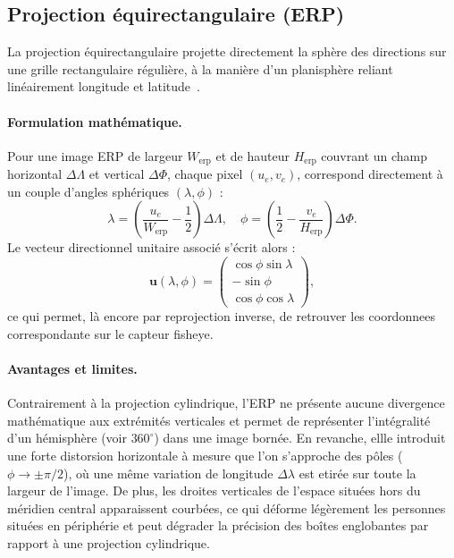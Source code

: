 \documentclass[11pt,a4paper]{article}
\begin{document}
\subsection{Projection équirectangulaire (ERP)}

La projection équirectangulaire projette directement la sphère des directions sur une grille rectangulaire régulière, à la manière d'un planisphère reliant linéairement longitude et latitude~\cite{ohashi2017,bourkefish2pano}.

\paragraph{Formulation mathématique.}
Pour une image ERP de largeur $W_{\text{erp}}$ et de hauteur $H_{\text{erp}}$ couvrant un champ horizontal $\Delta\Lambda$ et vertical $\Delta\Phi$, chaque pixel $(u_e, v_e)$, correspond directement à un couple d'angles sphériques $(\lambda, \phi)$ :
\begin{equation}
\lambda = \left(\frac{u_e}{W_{\text{erp}}} - \frac{1}{2}\right)\Delta\Lambda, \quad \phi = \left(\frac{1}{2} - \frac{v_e}{H_{\text{erp}}}\right)\Delta\Phi.
\end{equation}
Le vecteur directionnel unitaire associé s'écrit alors :
\begin{equation}
\mathbf{u}(\lambda, \phi) = \begin{pmatrix} \cos\phi\sin\lambda \\ -\sin\phi \\ \cos\phi\cos\lambda \end{pmatrix},
\end{equation}
ce qui permet, là encore par reprojection inverse, de retrouver les coordonnees correspondante sur le capteur fisheye.

\paragraph{Avantages et limites.}
Contrairement à la projection cylindrique, l'ERP ne présente aucune divergence mathématique aux extrémités verticales et permet de représenter l'intégralité d'un hémisphère (voir $360^\circ$) dans une image bornée. En revanche, ellle introduit une forte distorsion horizontale à mesure que l'on s'approche des pôles ($\phi \to \pm \pi/2$), où une même variation de longitude $\Delta\lambda$ est etirée sur toute la largeur de l'image. De plus, les droites verticales de l'espace situées hors du méridien central apparaissent courbées, ce qui déforme légèrement les personnes situées en périphérie et peut dégrader la précision des boîtes englobantes par rapport à une projection cylindrique.
\end{document}
